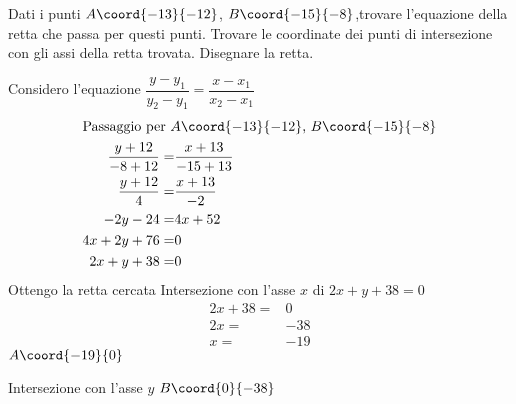 	Dati i punti  $A\coord{-13}{-12}$, $B\coord{-15}{-8}$,trovare l'equazione della retta che passa per questi punti. Trovare le coordinate dei punti di intersezione con gli assi della retta trovata. Disegnare la retta.

	Considero l'equazione  $\dfrac{y-y_1}{y_2-y_1}=\dfrac{x-x_1}{x_2-x_1}$
	\begin{align*}
		\intertext{Passaggio per  $A\coord{-13}{-12}$, $B\coord{-15}{-8}$}
		\dfrac{y+12}{-8+12}=&\dfrac{x+13}{-15+13}\\
		\dfrac{y+12}{4}=&\dfrac{x+13}{-2}\\
		-2y-24=&4x+52\\
		4x+2y+76=&0\\
		2x+y+38=&0\\
	\end{align*}
	Ottengo la retta cercata
	Intersezione con l'asse $x$ di $2x+y+38=0$
	\begin{align*}
		2x+38=&0\\
		2x=&-38\\
		x=&-19
	\end{align*}
	$A\coord{-19}{0}$

	Intersezione con l'asse $y$
	$B\coord{0}{-38}$
		\begin{center}
			
		\end{center}

